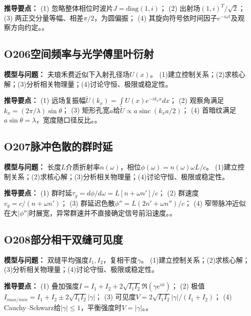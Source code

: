 \par\textbf{推导要点：} (1) 忽略整体相位时波片$J=\mathrm{diag}(1,i)$； (2) 出射场$(1,i)^T/\sqrt2$； (3) 两正交分量等幅、相差$\pi/2$，为圆偏振； (4) 其旋向符号依时间因子$e^{-i\omega t}$及观察方向约定。。

\par\medskip

\subsection*{O206\quad 空间频率与光学傅里叶衍射}

\textbf{模型与问题：} 夫琅禾费近似下入射孔径场$U(x)$。 (1)建立控制关系；(2)求核心解；(3)分析相关物理量；(4)讨论守恒、极限或稳定性。

\par\textbf{推导要点：} (1) 远场复振幅$\widetilde U(k_x)=\int U(x)e^{-ik_xx}dx$； (2) 观察角满足$k_x=(2\pi/\lambda)\sin\theta$； (3) 矩形孔宽$a$给$\widetilde U\propto a\operatorname{sinc}(k_xa/2)$； (4) 首暗纹满足$a\sin\theta=\lambda$，宽度随口径反比。。

\par\medskip

\subsection*{O207\quad 脉冲色散的群时延}

\textbf{模型与问题：} 长度$L$介质折射率$n(\omega)$，相位$\phi(\omega)=n(\omega)\omega L/c$。 (1)建立控制关系；(2)求核心解；(3)分析相关物理量；(4)讨论守恒、极限或稳定性。

\par\textbf{推导要点：} (1) 群时延$\tau_g=d\phi/d\omega=L[n+\omega n']/c$； (2) 群速度$v_g=c/(n+\omega n')$； (3) 群延迟色散$\phi''=L(2n'+\omega n'')/c$； (4) 窄带脉冲近似在大$|\phi''|$时展宽，异常群速并不直接确定信号前沿速度。。

\par\medskip

\subsection*{O208\quad 部分相干双缝可见度}

\textbf{模型与问题：} 双缝平均强度$I_1,I_2$，复相干度$\gamma$。 (1)建立控制关系；(2)求核心解；(3)分析相关物理量；(4)讨论守恒、极限或稳定性。

\par\textbf{推导要点：} (1) 叠加强度$I=I_1+I_2+2\sqrt{I_1I_2}\Re(\gamma e^{i\phi})$； (2) 极值$I_{max/min}=I_1+I_2\pm2\sqrt{I_1I_2}|\gamma|$； (3) 可见度$V=2\sqrt{I_1I_2}|\gamma|/(I_1+I_2)$； (4) Cauchy–Schwarz给$|\gamma|\le1$，平衡强度时$V=|\gamma|$。。


